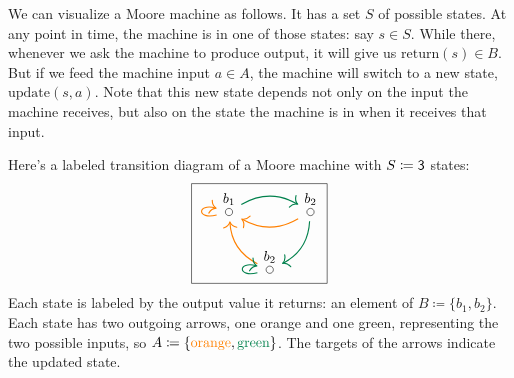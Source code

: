\documentclass[Book-Poly]{subfiles}
\begin{document}
We can visualize a Moore machine as follows.
It has a set $S$ of possible states.
At any point in time, the machine is in one of those states: say $s \in S$.
While there, whenever we ask the machine to produce output, it will give us $\text{return}(s) \in B$.
But if we feed the machine input $a \in A$, the machine will switch to a new state, $\text{update}(s, a)$.
Note that this new state depends not only on the input the machine receives, but also on the state the machine is in when it receives that input.

\begin{example}\label{ex.Moore_three}
Here's a labeled transition diagram of a Moore machine with $S\coloneqq\textsf{3}$ states:
\begin{equation} \label{eqn.trans_diag}
\begin{tikzpicture}
	\node[draw] {
  \begin{tikzcd}[column sep=small]
  	\LMO{b_1}\ar[rr, dgreen, thick, bend left]\ar[loop left, thick, orange]&&
  	\LMO{b_2}\ar[ll, thick, orange, bend left]\ar[dl, bend left, thick, dgreen]\\&
  	\LMO{b_2} \ar[ul, thick, orange, bend left] \ar[loop left, thick, dgreen]
  \end{tikzcd}
  };
\end{tikzpicture}
\end{equation}
Each state is labeled by the output value it returns: an element of $B\coloneqq\{b_1,b_2\}$. Each state has two outgoing arrows, one orange and one green, representing the two possible inputs, so $A\coloneqq\{{\color{orange}\text{orange}},{\color{dgreen}\text{green}}\}$.
The targets of the arrows indicate the updated state.


\end{example}
\end{document}
